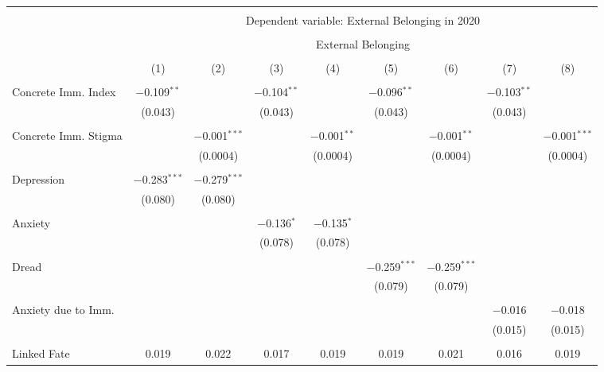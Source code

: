 
\begin{table}[!htbp] \centering 
  \caption{} 
  \label{} 
\begin{tabular}{@{\extracolsep{5pt}}lcccccccc} 
\\[-1.8ex]\hline 
\hline \\[-1.8ex] 
 & \multicolumn{8}{c}{Dependent variable: External Belonging in 2020} \\ 
\cline{2-9} 
\\[-1.8ex] & \multicolumn{8}{c}{External Belonging} \\ 
\\[-1.8ex] & (1) & (2) & (3) & (4) & (5) & (6) & (7) & (8)\\ 
\hline \\[-1.8ex] 
 Concrete Imm. Index & $-$0.109$^{**}$ &  & $-$0.104$^{**}$ &  & $-$0.096$^{**}$ &  & $-$0.103$^{**}$ &  \\ 
  & (0.043) &  & (0.043) &  & (0.043) &  & (0.043) &  \\ 
  & & & & & & & & \\ 
 Concrete Imm. Stigma &  & $-$0.001$^{***}$ &  & $-$0.001$^{**}$ &  & $-$0.001$^{**}$ &  & $-$0.001$^{***}$ \\ 
  &  & (0.0004) &  & (0.0004) &  & (0.0004) &  & (0.0004) \\ 
  & & & & & & & & \\ 
 Depression & $-$0.283$^{***}$ & $-$0.279$^{***}$ &  &  &  &  &  &  \\ 
  & (0.080) & (0.080) &  &  &  &  &  &  \\ 
  & & & & & & & & \\ 
 Anxiety &  &  & $-$0.136$^{*}$ & $-$0.135$^{*}$ &  &  &  &  \\ 
  &  &  & (0.078) & (0.078) &  &  &  &  \\ 
  & & & & & & & & \\ 
 Dread &  &  &  &  & $-$0.259$^{***}$ & $-$0.259$^{***}$ &  &  \\ 
  &  &  &  &  & (0.079) & (0.079) &  &  \\ 
  & & & & & & & & \\ 
 Anxiety due to Imm. &  &  &  &  &  &  & $-$0.016 & $-$0.018 \\ 
  &  &  &  &  &  &  & (0.015) & (0.015) \\ 
  & & & & & & & & \\ 
 Linked Fate & 0.019 & 0.022 & 0.017 & 0.019 & 0.019 & 0.021 & 0.016 & 0.019 \\ 

\end{tabular}
\end{table}
